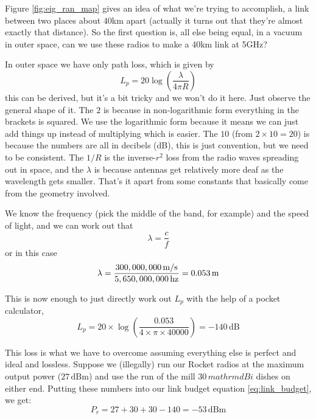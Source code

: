 Figure \ref{fig:eig_ran_map} gives an idea of what we're trying to
accomplish, a link between two places about 40km apart (actually it
turns out that they're almost exactly that distance). So the first
question is, all else being equal, in a vacuum in outer space, can we
use these radios to make a 40km link at 5GHz?

In outer space we have only path loss, which is given by
\begin{equation}
L_p = 20 \log \left(\frac{\lambda}{4 \pi R}\right)
\end{equation}
this can be derived, but it's a bit tricky and we won't do it
here. Just observe the general shape of it. The $2$ is because in
non-logarithmic form everything in the brackets is squared. We use the
logarithmic form because it means we can just add things up instead of
multiplying which is easier. The $10$ (from $2 \times 10 = 20$) is
because the numbers are all in decibels (dB), this is just convention,
but we need to be consistent. The $1/R$ is the inverse-$r^2$
loss from the radio waves spreading out in space, and the $\lambda$ is
because antennas get relatively more deaf as the wavelength gets
smaller. That's it apart from some constants that basically come from
the geometry involved.

We know the frequency (pick the middle of the band, for example) and
the speed of light, and we can work out that
\begin{equation}
\lambda = \frac{c}{f}
\end{equation}
or in this case
$$
\lambda = \frac{%
  300,000,000\, \mathrm{m}/\mathrm{s}%
}{%
  5,650,000,000\,\mathrm{hz}%
} = 0.053\, \mathrm{m}
$$

This is now enough to just directly work out $L_p$ with the help of a
pocket calculator,
$$
L_p = 20 \times \log \left( \frac{0.053}{4 \times \pi \times 40000} \right)
= -140\,\mathrm{dB}
$$

This loss is what we have to overcome assuming everything else is
perfect and ideal and lossless. Suppose we (illegally) run our Rocket
radios at the maximum output power ($27\,\mathrm{dBm}$) and use the
run of the mill $30\, mathrm{dBi}$ dishes on either end. Putting these
numbers into our link budget equation \ref{eq:link_budget}, we get:
$$
P_r = 27 + 30 + 30 - 140 = -53\, \mathrm{dBm}
$$

